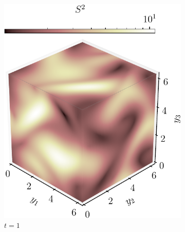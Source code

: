 \begin{figure}
	\centering
	\begin{subfigure}[t]{0.49\textwidth}
		\includegraphics[width=\textwidth]{chp04_paper_numerics/figures/gabc/S2_box_1.0_cropped}
		\caption{\(t = 1\)}
		\label{fig:gabc_S2_1}
	\end{subfigure}
	\begin{subfigure}[t]{0.49\textwidth}

\end{subfigure}
\end{figure}
